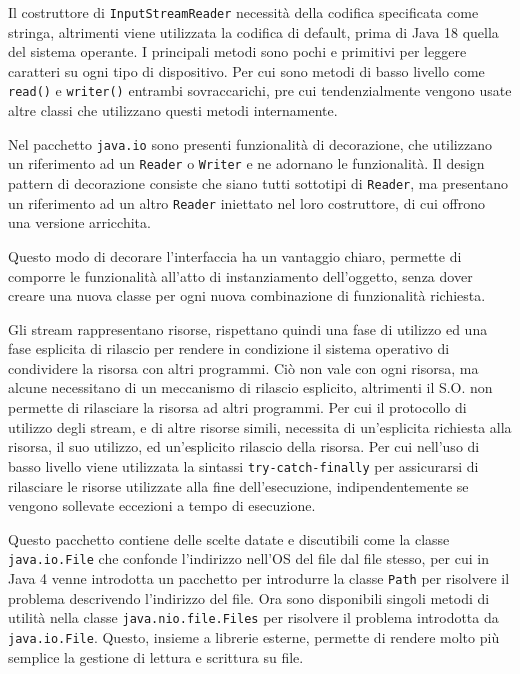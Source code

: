 \documentclass{article}
\numberwithin{equation}{subsection}
\begin{document}
Il costruttore di \verb|InputStreamReader| necessità della codifica specificata come stringa, altrimenti viene utilizzata la codifica di default, prima di Java 18 quella del sistema 
operante. 
I principali metodi sono pochi e primitivi per leggere caratteri su ogni tipo di dispositivo. Per cui sono metodi di basso livello come \verb|read()| e \verb|writer()| 
entrambi sovraccarichi, pre cui tendenzialmente vengono usate altre classi che utilizzano questi metodi internamente. 

Nel pacchetto \verb|java.io| sono presenti funzionalità di decorazione, che utilizzano un riferimento ad un \verb|Reader| o \verb|Writer| e ne adornano le funzionalità. 
Il design pattern di decorazione consiste che siano tutti sottotipi di \verb|Reader|, ma presentano un riferimento ad un altro \verb|Reader| iniettato nel loro costruttore, di cui 
offrono una versione arricchita. 

Questo modo di decorare l'interfaccia ha un vantaggio chiaro, permette di comporre le funzionalità all'atto di instanziamento dell'oggetto, senza dover creare una nuova classe 
per ogni nuova combinazione di funzionalità richiesta. 

Gli stream rappresentano risorse, rispettano quindi una fase di utilizzo ed una fase esplicita di rilascio per rendere in condizione il sistema operativo di condividere la 
risorsa con altri programmi. 
Ciò non vale con ogni risorsa, ma alcune necessitano di un meccanismo di rilascio esplicito, altrimenti il S.O. non permette di rilasciare la risorsa ad altri programmi. 
Per cui il protocollo di utilizzo degli stream, e di altre risorse simili, necessita di un'esplicita richiesta alla risorsa, il suo utilizzo, ed un'esplicito rilascio 
della risorsa. 
Per cui nell'uso di basso livello viene utilizzata la sintassi \verb|try-catch-finally| per assicurarsi di rilasciare le risorse utilizzate alla fine dell'esecuzione, 
indipendentemente se vengono sollevate eccezioni a tempo di esecuzione. 

Questo pacchetto contiene delle scelte datate e discutibili come la classe \verb|java.io.File| che confonde l'indirizzo nell'OS del file dal file stesso, per cui in Java 4 
venne introdotta un pacchetto per introdurre la classe \verb|Path| per risolvere il problema descrivendo l'indirizzo del file. 
Ora sono disponibili singoli metodi di utilità nella classe \verb|java.nio.file.Files| per risolvere il problema introdotta da \verb|java.io.File|. Questo, insieme a librerie 
esterne, permette di rendere molto più semplice la gestione di lettura e scrittura su file. 
\end{document}
